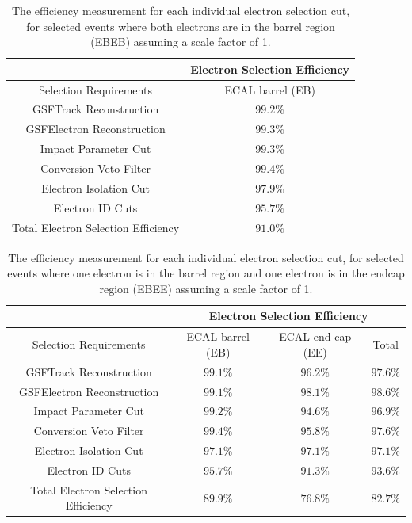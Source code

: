 \documentclass{cmspaper}
\begin{document}
\begin{table}[!ht]
\begin{center}
\begin{tabular}{|c|c|}
\hline
 & Electron Selection Efficiency \\
\hline
 Selection Requirements & ECAL barrel (EB)  \\
\hline
\hline
 GSFTrack Reconstruction             & $99.2\%$   \\
 GSFElectron Reconstruction          & $99.3\%$   \\
 Impact Parameter Cut                & $99.3\%$   \\
 Conversion Veto Filter              & $99.4\%$   \\
 Electron Isolation Cut              & $97.9\%$   \\
 Electron ID Cuts                    & $95.7\%$   \\
\hline                               
 Total Electron Selection Efficiency & $91.0\%$   \\
\hline
\end{tabular}
\caption{The efficiency measurement for each individual electron selection cut, for selected \Z\To\Ep\Em events where both electrons are in the barrel region (EBEB) assuming a scale factor of 1. \label{tab:electronEfficiencies_EBEB}}
\end{center}
\end{table}

\begin{table}[!ht]
\begin{center}
\begin{tabular}{|c|c|c|c|}
\hline
 & \multicolumn{3}{|c|}{Electron Selection Efficiency} \\
\hline
 Selection Requirements & ECAL barrel (EB) & ECAL end cap (EE) & Total \\
\hline
\hline
 GSFTrack Reconstruction             & $99.1\%$  & $96.2\%$ & $97.6\%$ \\
 GSFElectron Reconstruction          & $99.1\%$  & $98.1\%$ & $98.6\%$ \\
 Impact Parameter Cut                & $99.2\%$  & $94.6\%$ & $96.9\%$ \\
 Conversion Veto Filter              & $99.4\%$  & $95.8\%$ & $97.6\%$ \\
 Electron Isolation Cut              & $97.1\%$  & $97.1\%$ & $97.1\%$ \\
 Electron ID Cuts                    & $95.7\%$  & $91.3\%$ & $93.6\%$ \\
\hline                               
 Total Electron Selection Efficiency & $89.9\%$  & $76.8\%$ & $82.7\%$ \\
\hline
\end{tabular}
\caption{The efficiency measurement for each individual electron selection cut, for selected \Z\To\Ep\Em events where one electron is in the barrel region and one electron is in the endcap region (EBEE) assuming a scale factor of 1. \label{tab:electronEfficiencies_EBEE}}
\end{center}
\end{table}
\end{document}

